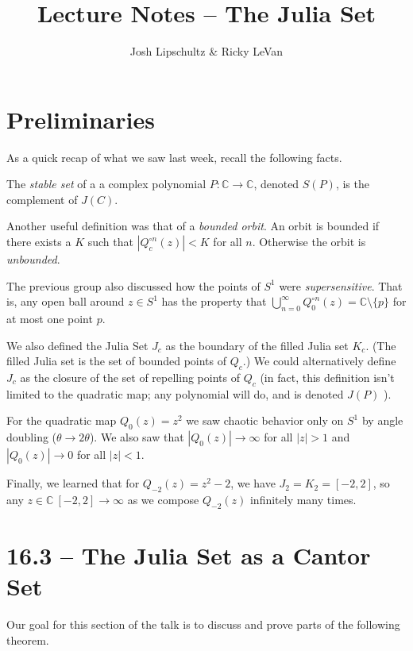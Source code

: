 \documentclass[symmetric]{tufte-handout}
\title{Lecture Notes -- The Julia Set}
\author{Josh Lipschultz \& Ricky LeVan}
\date{}  %
\begin{document}
\maketitle%

\section{Preliminaries}\label{sec:problem-1}

As a quick recap of what we saw last week, recall the following facts.

The \textsl{stable set} of a a complex polynomial $P: \mathbb{C} \rightarrow \mathbb{C}$, denoted $S(P)$, is the complement of $J(C)$.

Another useful definition was that of a \textsl{bounded orbit}. An orbit is bounded if there exists a $K$ such that $|Q_c^{\circ n}(z)| < K$ for all $n$. Otherwise the orbit is \textsl{unbounded}.

The previous group also discussed how the points of $S^1$ were \textsl{supersensitive}. That is, any open ball around $z \in S^1$ has the property that $\bigcup_{n=0}^\infty Q_0^{\circ n} (z) = \mathbb{C} \setminus \{p\}$ for at most one point $p$.

We also defined the Julia Set $J_c$ as the boundary of the filled Julia set $K_c$. (The filled Julia set is the set of bounded points of $Q_c$.) We could alternatively define $J_c$ as the closure of the set of repelling points of $Q_c$ (in fact, this definition isn't limited to the quadratic map; any polynomial will do, and is denoted $J(P)$ ).

For the quadratic map $Q_0(z) = z^2$ we saw chaotic behavior only on $S^1$ by angle doubling ($\theta \rightarrow 2\theta$). We also saw that $|Q_0(z)| \rightarrow \infty$ for all $|z| > 1$ and $|Q_0(z)| \rightarrow 0$ for all $|z| < 1$.

Finally, we learned that for $Q_{-2}(z) = z^2 - 2$, we have $J_2 = K_2 = [-2, 2]$, so any $z \in \mathbb{C} \ [-2,2] \rightarrow \infty$ as we compose $Q_{-2}(z)$ infinitely many times. 


\section{16.3 -- The Julia Set as a Cantor Set}\label{sec:problem-1}

Our goal for this section of the talk is to discuss and prove parts of
the following theorem.
\end{document}
